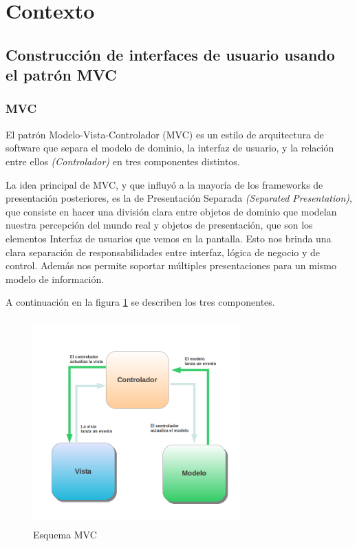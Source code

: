 \section{Contexto}
\subsection{Construcción de interfaces de usuario usando el patrón MVC}

	\subsubsection{MVC}
	El patrón Modelo-Vista-Controlador (MVC) es un estilo de arquitectura de
	software que separa el modelo de dominio, la interfaz de usuario,
	y la relación entre ellos \emph{(Controlador)} en tres componentes distintos.
	\cite{burbeck87}
	
	La idea principal de MVC, y que influyó a la mayoría de los frameworks de
	presentación posteriores, es la de Presentación Separada \emph{(Separated
	Presentation)}, que consiste en hacer una división clara entre objetos de 
	dominio que modelan nuestra percepción del mundo real y objetos de presentación, 
	que son los elementos Interfaz de usuarios que vemos en la pantalla. 
	Esto nos brinda una clara separación de responsabilidades entre interfaz,
	lógica de negocio y de control. Además nos permite soportar múltiples
	presentaciones para un mismo modelo de información. \cite{reenskaug79}
	\bigskip
	
	A continuación en la figura \ref{mvc} se describen los tres componentes.  
	
	\begin{figure}[h]
		\centering
		\includegraphics[width=300px, height=300px]{img/mvc} 
		\caption{Esquema MVC}
		\label{mvc}
	\end{figure}  
	
